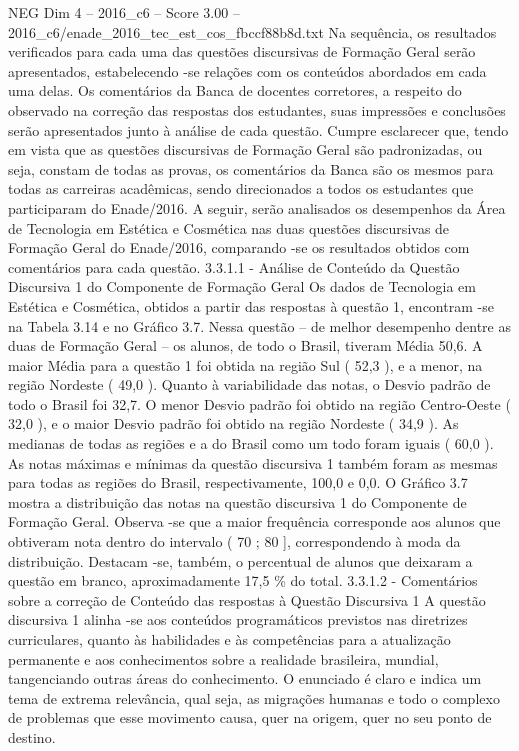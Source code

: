 \begin{textsample}{NEG Dim 4 – 2016\_c6 – Score 3.00 – 2016\_c6/enade\_2016\_tec\_est\_cos\_fbccf88b8d.txt}
Na sequência, os resultados verificados para cada uma das questões discursivas de Formação Geral serão apresentados, estabelecendo -se relações com os conteúdos abordados em cada uma delas.
Os comentários da Banca de docentes corretores, a respeito do observado na correção das respostas dos estudantes, suas impressões e conclusões serão apresentados junto à análise de cada questão.
Cumpre esclarecer que, tendo em vista que as questões discursivas de Formação Geral são padronizadas, ou seja, constam de todas as provas, os comentários da Banca são os mesmos para todas as carreiras acadêmicas, sendo direcionados a todos os estudantes que participaram do Enade/2016.
A seguir, serão analisados os desempenhos da Área de Tecnologia em Estética e Cosmética nas duas questões discursivas de Formação Geral do Enade/2016, comparando -se os resultados obtidos com comentários para cada questão. 3.3.1.1 - Análise de Conteúdo da Questão Discursiva 1 do Componente de Formação Geral Os dados de Tecnologia em Estética e Cosmética, obtidos a partir das respostas à questão 1, encontram -se na Tabela 3.14 e no Gráfico 3.7.
Nessa questão – de melhor desempenho dentre as duas de Formação Geral – os alunos, de todo o Brasil, tiveram Média 50,6.
A maior Média para a questão 1 foi obtida na região Sul ( 52,3 ), e a menor, na região Nordeste ( 49,0 ).
Quanto à variabilidade das notas, o Desvio padrão de todo o Brasil foi 32,7.
O menor Desvio padrão foi obtido na região Centro-Oeste ( 32,0 ), e o maior Desvio padrão foi obtido na região Nordeste ( 34,9 ).
As medianas de todas as regiões e a do Brasil como um todo foram iguais ( 60,0 ).
As notas máximas e mínimas da questão discursiva 1 também foram as mesmas para todas as regiões do Brasil, respectivamente, 100,0 e 0,0.
O Gráfico 3.7 mostra a distribuição das notas na questão discursiva 1 do Componente de Formação Geral.
Observa -se que a maior frequência corresponde aos alunos que obtiveram nota dentro do intervalo ( 70 ; 80 ], correspondendo à moda da distribuição.
Destacam -se, também, o percentual de alunos que deixaram a questão em branco, aproximadamente 17,5 \% do total. 3.3.1.2 - Comentários sobre a correção de Conteúdo das respostas à Questão Discursiva 1 A questão discursiva 1 alinha -se aos conteúdos programáticos previstos nas diretrizes curriculares, quanto às habilidades e às competências para a atualização permanente e aos conhecimentos sobre a realidade brasileira, mundial, tangenciando outras áreas do conhecimento.
O enunciado é claro e indica um tema de extrema relevância, qual seja, as migrações humanas e todo o complexo de problemas que esse movimento causa, quer na origem, quer no seu ponto de destino.

\end{textsample}
